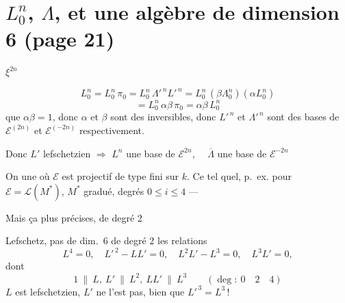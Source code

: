 \documentclass[11pt,a4paper]{article}
\begin{document}
\section*{$L^{n}_{0}$, $\Lambda$, et une algèbre de dimension 6 (page 21)}


\struck{\ill{}} $\xi^{2n}$ \struck{\ill{}}


\[
L^{n}_{0} = L^{n}_{0}\,\pi_{0} = L^{n}_{0}\,\Lambda'^{\,n} L'^{\,n}
 = L^{n}_{0}\,(\beta \Lambda^{n}_{0})(\alpha L^{n}_{0})
\]
\[
= L^{n}_{0}\,\alpha\beta\,\pi_{0} = \alpha\beta\,L^{n}_{0}
\]
\ill{} que $\alpha\beta = 1$, donc $\alpha$ et $\beta$ sont des inversibles, donc
\struck{\ill{}} $L'^{\,n}$ et $\Lambda'^{\,n}$ sont des bases de $\mathcal{E}^{(2n)}$ et
$\mathcal{E}^{(-2n)}$ respectivement.


Donc $L'$ lefschetzien $\Longrightarrow$ $L^{n}$ une base de
$\mathcal{E}^{2n}$, \ \ $\overline{\Lambda}$ une base de $\mathcal{E}^{-2n}$


On  une  \ill{} où $\mathcal{E}$ est
projectif de type fini sur $k$. Ce \ill{} tel quel, p.~ex.
pour $\mathcal{E} = \mathcal{L}(M^{*})$, $M^{*}$ gradué, degrés
$0 \le i \le 4$ ---

Mais ça \ill{} plus précises, \ill{} de degré 2 \ill{}

Lefschetz, pas \ill{} de dim.\ 6 \ill{} de degré 2 \ill{} les
relations
\[
L^{4} = 0, \quad L'^{\,2} - LL' = 0, \quad L^{2}L' - L^{3} = 0, \quad L^{3}L' = 0,
\]
dont 
\[
1 \ \| \ L,\ L' \ \| \ L^{2},\ LL' \ \| \ L^{3}
\qquad (\deg : \ 0 \quad 2 \quad 4)
\]
$L$ est lefschetzien, $L'$ ne l'est pas, bien que $L'^{\,3} = L^{3}$\,!
\end{document}
